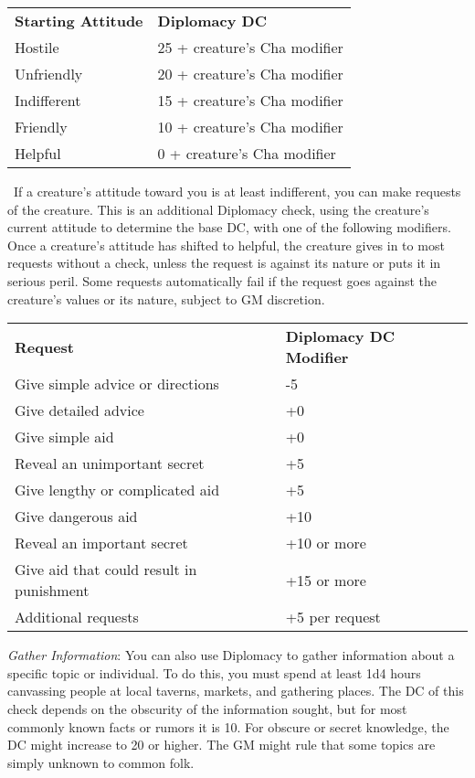 \begin{table}
 \sffamily
 \begin{tabular}{ll}
\textbf{Starting Attitude} & \textbf{Diplomacy DC}\\
Hostile & 25 + creature's Cha modifier\\
Unfriendly & 20 + creature's Cha modifier\\
Indifferent & 15 + creature's Cha modifier\\
Friendly & 10 + creature's Cha modifier\\
Helpful & 0 + creature's Cha modifier\\
 \end{tabular}

\end{table}
\	
If a creature's attitude toward you is at least indifferent, you can make requests of the creature. This is an additional Diplomacy check, using the creature's current attitude to determine the base DC, with one of the following modifiers. Once a creature's attitude has shifted to helpful, the creature gives in to most requests without a check, unless the request is against its nature or puts it in serious peril. Some requests automatically fail if the request goes against the creature's values or its nature, subject to GM discretion.

\begin{table}
\sffamily
 \begin{tabular}{ll}
\textbf{Request} & \textbf{Diplomacy DC Modifier}\\
Give simple advice or directions & -5\\
Give detailed advice & +0\\
Give simple aid & +0\\
Reveal an unimportant secret & +5\\
Give lengthy or complicated aid & +5\\
Give dangerous aid & +10\\
Reveal an important secret & +10 or more\\
Give aid that could result in punishment & +15 or more\\
Additional requests & +5 per request\\
 \end{tabular}

\end{table}

				
\textit{Gather Information}: You can also use Diplomacy to gather information about a specific topic or individual. To do this, you must spend at least 1d4 hours canvassing people at local taverns, markets, and gathering places. The DC of this check depends on the obscurity of the information sought, but for most commonly known facts or rumors it is 10. For obscure or secret knowledge, the DC might increase to 20 or higher. The GM might rule that some topics are simply unknown to common folk.
				
